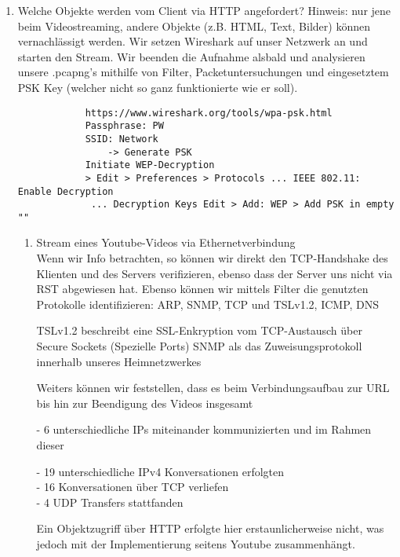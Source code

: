 \documentclass[11pt]{article}
\begin{document}
\begin{enumerate}
        \item Welche Objekte werden vom Client via HTTP angefordert? Hinweis: nur jene beim Videostreaming, andere Objekte (z.B. HTML, Text, Bilder) können vernachlässigt werden.
            Wir setzen Wireshark auf unser Netzwerk an und starten  den Stream.
            Wir beenden die Aufnahme alsbald und analysieren unsere .pcapng's mithilfe von Filter, Packetuntersuchungen und
            eingesetztem PSK Key (welcher nicht so ganz funktionierte wie er soll).
        \begin{verbatim}
            https://www.wireshark.org/tools/wpa-psk.html
            Passphrase: PW
            SSID: Network
                -> Generate PSK
            Initiate WEP-Decryption
            > Edit > Preferences > Protocols ... IEEE 802.11: Enable Decryption
             ... Decryption Keys Edit > Add: WEP > Add PSK in empty ""
        \end{verbatim}
        \begin{enumerate}[\thesection .1]
            \item Stream eines Youtube-Videos via Ethernetverbindung\\
            Wenn wir Info betrachten, so können wir direkt den TCP-Handshake des Klienten und des Servers verifizieren, ebenso dass
            der Server uns nicht via RST abgewiesen hat.
            Ebenso können wir mittels Filter die genutzten Protokolle identifizieren: ARP,  SNMP, TCP und TSLv1.2, ICMP, DNS
            \begin{addmargin}[1em]{1em}
                TSLv1.2 beschreibt eine SSL-Enkryption vom TCP-Austausch über Secure Sockets (Spezielle Ports)
                SNMP als das Zuweisungsprotokoll innerhalb unseres Heimnetzwerkes
            \end{addmargin}
            Weiters können wir feststellen, dass es beim Verbindungsaufbau zur URL bis hin zur Beendigung des Videos insgesamt
            \begin{addmargin}[1em]{1em}
                - 6 unterschiedliche IPs miteinander kommunizierten und im Rahmen dieser
                \begin{addmargin}[1em]{1em}
                    - 19 unterschiedliche IPv4 Konversationen erfolgten\\
                    - 16 Konversationen über TCP verliefen\\
                    - 4 UDP Transfers stattfanden\\
                \end{addmargin}
            \end{addmargin}
            Ein Objektzugriff über HTTP erfolgte hier erstaunlicherweise nicht, was jedoch mit der Implementierung seitens Youtube zusammenhängt.\\


\end{enumerate}
\end{enumerate}
\end{document}
